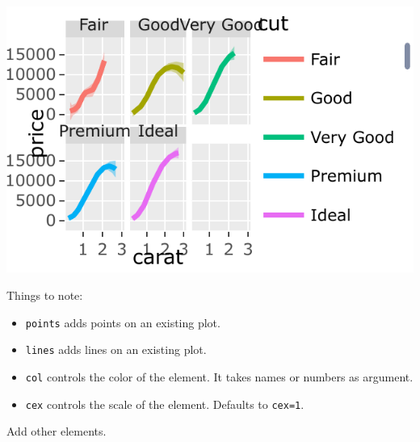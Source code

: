\documentclass[]{book}
\providecommand{\tightlist}{%
  \setlength{\itemsep}{0pt}\setlength{\parskip}{0pt}}
\theoremstyle{definition}
\theoremstyle{definition}
\theoremstyle{definition}
\theoremstyle{remark}
\begin{document}
\includegraphics[width=0.5\linewidth]{Rcourse_files/figure-latex/unnamed-chunk-251-1}

Things to note:

\begin{itemize}
\tightlist
\item
  \texttt{points} adds points on an existing plot.
\item
  \texttt{lines} adds lines on an existing plot.
\item
  \texttt{col} controls the color of the element. It takes names or numbers as argument.
\item
  \texttt{cex} controls the scale of the element. Defaults to \texttt{cex=1}.
\end{itemize}

Add other elements.
\end{document}
